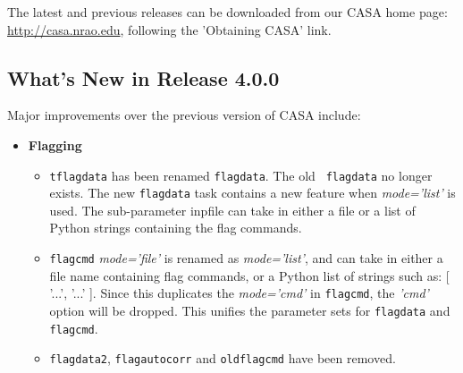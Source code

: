 The latest and previous releases can be downloaded from our CASA home
page: \url{http://casa.nrao.edu}, following the 'Obtaining CASA'
link.






\subsection{What's New in Release 4.0.0}
\label{section:intro.release.whatsnew}


Major improvements over the previous version of CASA include:

\begin{itemize}

\item {\bf  Flagging}
  \begin{itemize}

   \item {\tt tflagdata} has been renamed {\tt flagdata}. The old {\tt
       flagdata} no longer exists. The new {\tt flagdata} task
     contains a new feature when {\it mode='list'} is used. The sub-parameter inpfile can take in either a file or a list of Python strings containing the flag commands.

  \item {\tt flagcmd} {\it mode='file'} is renamed as {\it
      mode='list'}, and can take in either a file name containing flag
    commands, or a Python list of strings such as: [ '...', '...'
    ]. Since this duplicates the {\it mode='cmd'} in {\tt flagcmd},
    the {\it 'cmd'} option will be dropped. This unifies the parameter
    sets for {\tt flagdata} and {\tt flagcmd}.

    \item {\tt flagdata2}, {\tt flagautocorr} and {\tt oldflagcmd} have been removed.


\end{itemize}



\end{itemize}
